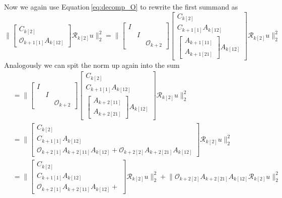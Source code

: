 \documentclass[doctype=mastersthesis,BCOR=15mm,biblatex]{ldvbook}%
\newcommand{\R}{\mathcal{R}} %
\newcommand{\Ob}{\mathcal{O}} %
\newcommand{\eye}{I} %
\begin{document}
Now we again use Equation\,\ref{eq:decomp_O} to rewrite the first summand as 
\begin{equation}
\Big\|
\begin{bmatrix}
C_{k[2]}\\
\Ob_{k+1[1]}A_{k[12]}
\end{bmatrix}  \R_{k[2]} u
\Big\|_2^2
=
\Big\|
\begin{bmatrix}
\eye\\&\eye\\&&\Ob_{k+2}
\end{bmatrix}
\begin{bmatrix}
C_{k[2]}\\
C_{k+1[1]}A_{k[12]}\\
\begin{bmatrix}
A_{k+1[11]}\\
A_{k+1[21]}
\end{bmatrix}
A_{k[12]}
\end{bmatrix}  \R_{k[2]} u
\Big\|_2^2
\end{equation}
Analogously we can spit the norm up again into the sum
\begin{align}
&=\Bigg\|
\begin{bmatrix}
\eye\\&\eye\\&&\Ob_{k+2}
\end{bmatrix}
\begin{bmatrix}
C_{k[2]}\\
C_{k+1[1]}A_{k[12]}\\
\begin{bmatrix}
A_{k+2[11]}\\
A_{k+2[21]}
\end{bmatrix}
A_{k[12]}
\end{bmatrix}  \R_{k[2]} u
\Bigg\|_2^2
\\
&=
\Bigg\|
\begin{bmatrix}
C_{k[2]}\\
C_{k+1[1]}A_{k[12]}\\
\Ob_{k+2[1]}A_{k+2[11]}A_{k[12]}+
\Ob_{k+2[2]}A_{k+2[21]}A_{k[12]}
\end{bmatrix}  \R_{k[2]} u
\Bigg\|_2^2
\\
&=
\Bigg\|
\begin{bmatrix}
C_{k[2]}\\
C_{k+1[1]}A_{k[12]}\\
\Ob_{k+2[1]}A_{k+2[11]}A_{k[12]}+
\end{bmatrix}  \R_{k[2]} u
\Bigg\|_2^2
+
\Big\|
\Ob_{k+2[2]}A_{k+2[21]}A_{k[12]}
\R_{k[2]} u
\Big\|_2^2
\end{align}
\end{document}
